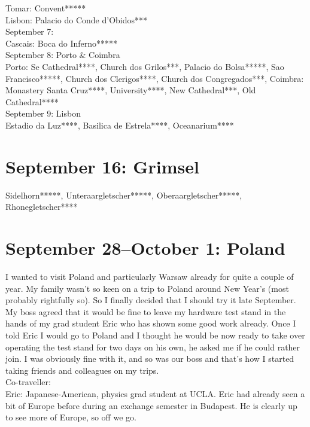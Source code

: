 Tomar: Convent*****\\
Lisbon: Palacio do Conde d'Obidos***\\

September 7:\\
Cascais: Boca do Inferno*****\\

September 8: Porto \& Coimbra\\
Porto: Se Cathedral****, Church dos Grilos***, Palacio do Bolsa*****, Sao Francisco*****, Church dos Clerigos****, Church dos Congregados***, Coimbra: Monastery Santa Cruz****, University****, New Cathedral***, Old Cathedral****\\

September 9: Lisbon\\
Estadio da Luz****, Basilica de Estrela****, Oceanarium****

\section{September 16: Grimsel}
\label{Grimsel2012}

Sidelhorn*****, Unteraargletscher*****, Oberaargletscher*****, Rhonegletscher****

\section{September 28--October 1: Poland}
\label{Poland2012}

I wanted to visit Poland and particularly Warsaw already for quite a couple of year. My family wasn't so keen on a trip to Poland around New Year's (most probably rightfully so). So I finally decided that I should try it late September. My boss agreed that it would be fine to leave my hardware test stand in the hands of my grad student Eric who has shown some good work already. Once I told Eric I would go to Poland and I thought he would be now ready to take over operating the test stand for two days on his own, he asked me if he could rather join. I was obviously fine with it, and so was our boss and that's how I started taking friends and colleagues on my trips.\\

Co-traveller:\\
Eric: Japanese-American, physics grad student at UCLA. Eric had already seen a bit of Europe before during an exchange semester in Budapest. He is clearly up to see more of Europe, so off we go.\\

